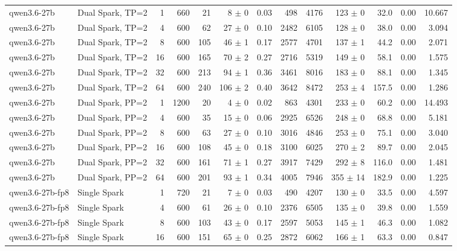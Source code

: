 \begin{tabular}{l l r r r r r r r r r r r}
\addlinespace
qwen3.6-27b & Dual Spark, TP=2 & 1 & 660 & 21\rlap{$^\dagger$} & 8 $\pm$ 0 & 0.03 & 498 & 4176 & 123 $\pm$ 0 & 32.0 & 0.00 & 10.667 \\
qwen3.6-27b & Dual Spark, TP=2 & 4 & 600 & 62\rlap{$^\dagger$} & 27 $\pm$ 0 & 0.10 & 2482 & 6105 & 128 $\pm$ 0 & 38.0 & 0.00 & 3.094 \\
qwen3.6-27b & Dual Spark, TP=2 & 8 & 600 & 105 & 46 $\pm$ 1 & 0.17 & 2577 & 4701 & 137 $\pm$ 1 & 44.2 & 0.00 & 2.071 \\
qwen3.6-27b & Dual Spark, TP=2 & 16 & 600 & 165 & 70 $\pm$ 2 & 0.27 & 2716 & 5319 & 149 $\pm$ 0 & 58.1 & 0.00 & 1.575 \\
qwen3.6-27b & Dual Spark, TP=2 & 32 & 600 & 213 & 94 $\pm$ 1 & 0.36 & 3461 & 8016 & 183 $\pm$ 0 & 88.1 & 0.00 & 1.345 \\
qwen3.6-27b & Dual Spark, TP=2 & 64 & 600 & 240 & 106 $\pm$ 2 & 0.40 & 3642 & 8472 & 253 $\pm$ 4 & 157.5 & 0.00 & 1.286 \\
\addlinespace
qwen3.6-27b & Dual Spark, PP=2 & 1 & 1200 & 20\rlap{$^\dagger$} & 4 $\pm$ 0 & 0.02 & 863 & 4301 & 233 $\pm$ 0 & 60.2 & 0.00 & 14.493 \\
qwen3.6-27b & Dual Spark, PP=2 & 4 & 600 & 35\rlap{$^\dagger$} & 15 $\pm$ 0 & 0.06 & 2925 & 6526 & 248 $\pm$ 0 & 68.8 & 0.00 & 5.181 \\
qwen3.6-27b & Dual Spark, PP=2 & 8 & 600 & 63\rlap{$^\dagger$} & 27 $\pm$ 0 & 0.10 & 3016 & 4846 & 253 $\pm$ 0 & 75.1 & 0.00 & 3.040 \\
qwen3.6-27b & Dual Spark, PP=2 & 16 & 600 & 108 & 45 $\pm$ 0 & 0.18 & 3100 & 6025 & 270 $\pm$ 2 & 89.7 & 0.00 & 2.045 \\
qwen3.6-27b & Dual Spark, PP=2 & 32 & 600 & 161 & 71 $\pm$ 1 & 0.27 & 3917 & 7429 & 292 $\pm$ 8 & 116.0 & 0.00 & 1.481 \\
qwen3.6-27b & Dual Spark, PP=2 & 64 & 600 & 201 & 93 $\pm$ 1 & 0.34 & 4005 & 7946 & 355 $\pm$ 14 & 182.9 & 0.00 & 1.225 \\
\addlinespace
qwen3.6-27b-fp8 & Single Spark & 1 & 720 & 21\rlap{$^\dagger$} & 7 $\pm$ 0 & 0.03 & 490 & 4207 & 130 $\pm$ 0 & 33.5 & 0.00 & 4.597 \\
qwen3.6-27b-fp8 & Single Spark & 4 & 600 & 61\rlap{$^\dagger$} & 26 $\pm$ 0 & 0.10 & 2376 & 6505 & 135 $\pm$ 0 & 39.8 & 0.00 & 1.559 \\
qwen3.6-27b-fp8 & Single Spark & 8 & 600 & 103 & 43 $\pm$ 0 & 0.17 & 2597 & 5053 & 145 $\pm$ 1 & 46.3 & 0.00 & 1.082 \\
qwen3.6-27b-fp8 & Single Spark & 16 & 600 & 151 & 65 $\pm$ 0 & 0.25 & 2872 & 6062 & 166 $\pm$ 1 & 63.3 & 0.00 & 0.847 \\

\end{tabular}
